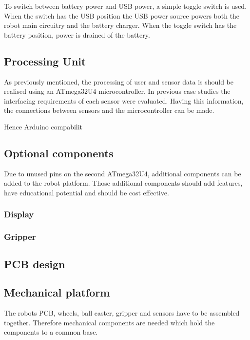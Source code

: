 \documentclass[11pt,a4paper]{article}
\begin{document}
To switch between battery power and USB power, a simple toggle switch is used. When the switch has the USB position the USB power source powers both the robot main circuitry and the battery charger. When the toggle switch has the battery position, power is drained of the battery.

\subsection{Processing Unit}
As previously mentioned, the processing of user and sensor data is should be realised using an ATmega32U4 microcontroller. In previous case studies the interfacing requirements of each sensor were evaluated. Having this information, the connections between sensors and the microcontroller can be made.

Hence Arduino compabilit


\subsection{Optional components}
Due to unused pins on the second ATmega32U4, additional components can be added to the robot platform. Those additional components should add features, have educational potential and should be cost effective.


\subsubsection{Display}
\subsubsection{Gripper}

\subsection{PCB design}

\subsection{Mechanical platform}
The robots PCB, wheels, ball caster, gripper and sensors have to be assembled together. Therefore mechanical components are needed which hold the components to a common base.
\end{document}
